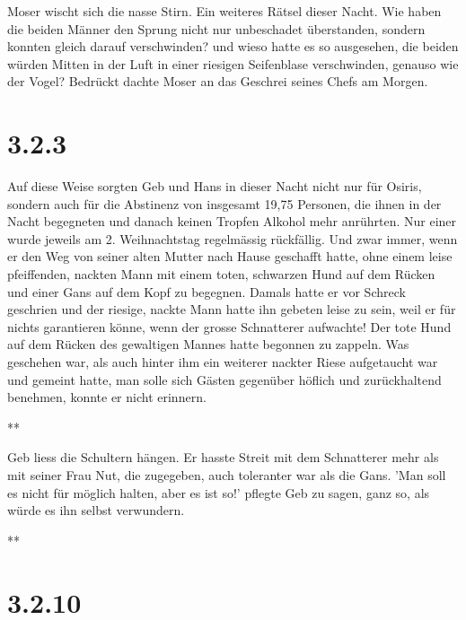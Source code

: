\documentclass[11pt,titlepage,a5paper]{book}
\newcommand{\sterne}{\par{\centering ***\par}}
\begin{document}
Moser wischt sich die nasse Stirn. Ein weiteres Rätsel dieser Nacht. Wie haben die beiden Männer den Sprung nicht nur unbeschadet überstanden, sondern konnten gleich darauf verschwinden? und wieso hatte es so ausgesehen, die beiden würden Mitten in der Luft in einer riesigen Seifenblase verschwinden, genauso wie der Vogel? Bedrückt dachte Moser an das Geschrei seines Chefs am Morgen. 

\section*{3.2.3}
 
 Auf diese Weise sorgten Geb und Hans in dieser Nacht nicht nur für Osiris, sondern auch für die Abstinenz von insgesamt 19,75 Personen, die ihnen in der Nacht begegneten und danach keinen Tropfen Alkohol mehr anrührten. Nur einer wurde jeweils am 2. Weihnachtstag regelmässig rückfällig. Und zwar immer, wenn er den Weg von seiner alten Mutter nach Hause geschafft hatte, ohne einem leise pfeiffenden, nackten Mann mit einem toten, schwarzen Hund auf dem Rücken und einer Gans auf dem Kopf zu begegnen. Damals hatte er vor Schreck geschrien und der riesige, nackte Mann hatte ihn gebeten leise zu sein, weil er für nichts garantieren könne, wenn der grosse Schnatterer aufwachte! Der tote Hund auf dem Rücken des gewaltigen Mannes hatte begonnen zu zappeln. Was geschehen war, als auch hinter ihm ein weiterer nackter Riese aufgetaucht war und gemeint hatte, man solle sich Gästen gegenüber höflich und zurückhaltend benehmen, konnte er nicht erinnern.

\sterne

Geb liess die Schultern hängen. Er hasste Streit mit dem Schnatterer mehr als mit seiner Frau Nut, die zugegeben, auch toleranter war als die Gans. 'Man soll es nicht für möglich halten, aber es ist so!' pflegte Geb zu sagen, ganz so, als würde es ihn selbst verwundern.

\sterne




















\section*{3.2.10}
\end{document}
